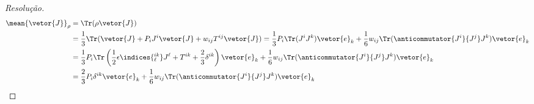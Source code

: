 \begin{proof}[Resolução]
    \begin{align*}
        \mean{\vetor{J}}_\rho &= \Tr( \rho \vetor{J})\\
                              &= \frac13 \Tr(\vetor{J} + P_i J^i \vetor{J} + w_{ij} T^{ij} \vetor{J}) = \frac13 P_i \Tr(J^i J^k) \vetor{e}_k + \frac16 w_{ij} \Tr(\anticommutator{J^i}{J^j}J^k) \vetor{e}_k\\
                              &= \frac13 P_i \Tr\left(\frac12 \epsilon\indices{^{ik}_\ell}J^\ell + T^{ik} + \frac23 \delta^{ik}\right)\vetor{e}_k + \frac16 w_{ij} \Tr(\anticommutator{J^i}{J^j}J^k)\vetor{e}_k\\
                              &= \frac23 P_i \delta^{ik} \vetor{e}_k + \frac16 w_{ij} \Tr(\anticommutator{J^i}{J^j} J^k) \vetor{e}_k
    \end{align*}
\end{proof}
